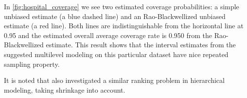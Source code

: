 \documentclass[article]{jss}
\begin{document}
In \ref{fig:hospital_coverage} we see two estimated coverage probabilities: a simple unbiased estimate (a blue dashed line) and an Rao-Blackwellized unbiased estimate (a red line). Both lines are indistinguishable from the horizontal line at 0.95 and the estimated overall average coverage rate is 0.950 from the Rao-Blackwellized estimate. This result shows that the interval estimates from the suggested multilevel modeling on this particular dataset have nice repeated sampling property.






It is noted that \cite{1995} also investigated a similar ranking problem in hierarchical modeling, taking shrinkage into account.
\end{document}
